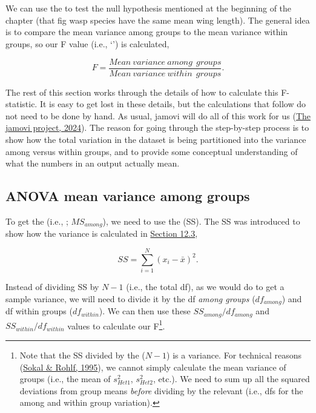 \documentclass[
  openany]{krantz}
\begin{document}
\hypertarget{section}{%
\section{\texorpdfstring{}{}}\label{section}}

We can use the  to test the null hypothesis mentioned at the beginning of the chapter (that fig wasp species have the same mean wing length).
The general idea is to compare the mean variance among groups to the mean variance within groups, so our F value (i.e., `') is calculated,

\[F = \frac{Mean\:variance\:among\:\:groups}{Mean\:variance\:within\:\:groups}.\]

The rest of this section works through the details of how to calculate this F-statistic.
It is easy to get lost in these details, but the calculations that follow do not need to be done by hand.
As usual, jamovi will do all of this work for us (\protect\hyperlink{ref-Jamovi2022}{The jamovi project, 2024}).
The reason for going through the  step-by-step process is to show how the total variation in the dataset is being partitioned into the variance among versus within groups, and to provide some conceptual understanding of what the numbers in an  output actually mean.

\hypertarget{anova-mean-variance-among-groups}{%
\subsection{ANOVA mean variance among groups}\label{anova-mean-variance-among-groups}}

To get the  (i.e., ; \(MS_{among}\)), we need to use the  (SS).
The SS was introduced to show how the variance is calculated in \protect\hyperlink{the-variance}{Section 12.3},

\[SS = \sum_{i = 1}^{N}\left(x_{i} - \bar{x} \right)^{2}.\]

Instead of dividing SS by \(N - 1\) (i.e., the total df), as we would do to get a sample variance, we will need to divide it by the df \emph{among groups} (\(df_{among}\)) and df within groups (\(df_{within}\)).
We can then use these \(SS_{among}/df_{among}\) and \(SS_{within}/df_{within}\) values to calculate our F\footnote{Note that the SS divided by the  (\(N - 1\)) is a variance. For technical reasons (\protect\hyperlink{ref-Sokal1995}{Sokal \& Rohlf, 1995}), we cannot simply calculate the mean variance of groups (i.e., the mean of \(s^{2}_{Het1}\), \(s^{2}_{Het2}\), etc.). We need to sum up all the squared deviations from group means \emph{before} dividing by the relevant  (i.e., dfs for the among and within group variation).}.
\end{document}
